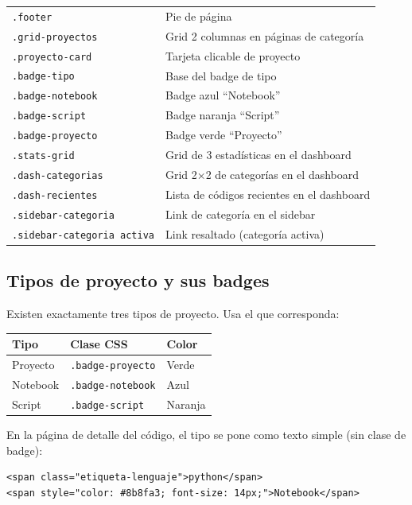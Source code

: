 \documentclass[12pt, a4paper]{article}
\newcommand{\clase}[1]{\texttt{\textcolor{cpAzul}{.#1}}}
\begin{document}
\begin{longtable}{lp{9cm}}
\clase{footer}               & Pie de página \\
\clase{grid-proyectos}       & Grid 2 columnas en páginas de categoría \\
\clase{proyecto-card}        & Tarjeta clicable de proyecto \\
\clase{badge-tipo}           & Base del badge de tipo \\
\clase{badge-notebook}       & Badge azul ``Notebook'' \\
\clase{badge-script}         & Badge naranja ``Script'' \\
\clase{badge-proyecto}       & Badge verde ``Proyecto'' \\
\clase{stats-grid}           & Grid de 3 estadísticas en el dashboard \\
\clase{dash-categorias}      & Grid 2×2 de categorías en el dashboard \\
\clase{dash-recientes}       & Lista de códigos recientes en el dashboard \\
\clase{sidebar-categoria}    & Link de categoría en el sidebar \\
\clase{sidebar-categoria activa} & Link resaltado (categoría activa) \\
\bottomrule
\end{longtable}

\subsection{Tipos de proyecto y sus badges}

Existen exactamente tres tipos de proyecto. Usa el que corresponda:

\begin{center}
\begin{tabular}{lll}
\toprule
\textbf{Tipo} & \textbf{Clase CSS} & \textbf{Color} \\
\midrule
Proyecto  & \clase{badge-proyecto}  & Verde \\
Notebook  & \clase{badge-notebook}  & Azul \\
Script    & \clase{badge-script}    & Naranja \\
\bottomrule
\end{tabular}
\end{center}

En la página de detalle del código, el tipo se pone como texto simple
(sin clase de badge):

\begin{lstlisting}[style=htmlstyle]
<span class="etiqueta-lenguaje">python</span>
<span style="color: #8b8fa3; font-size: 14px;">Notebook</span>
\end{lstlisting}
\end{document}
